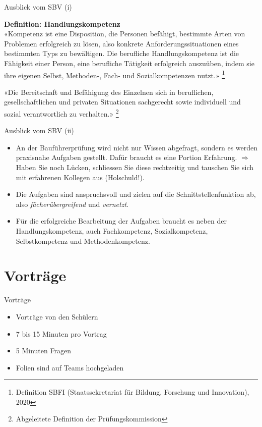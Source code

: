 \begin{frame}{Ausblick vom SBV (i)}

\textbf{Definition: Handlungskompetenz}\\
«Kompetenz ist eine Disposition, die Personen befähigt, bestimmte Arten von Problemen erfolgreich zu lösen, also konkrete Anforderungssituationen eines bestimmten Typs zu bewältigen.
Die berufliche Handlungskompetenz ist die Fähigkeit einer Person, eine berufliche Tätigkeit erfolgreich auszuüben, indem sie ihre eigenen Selbst, Methoden-, Fach- und Sozialkompetenzen nutzt.»
\footnote{Definition SBFI (Staatssekretariat für Bildung, Forschung und Innovation), 2020}
\vspace{1em}

«Die Bereitschaft und Befähigung des Einzelnen sich in beruflichen, gesellschaftlichen und privaten Situationen sachgerecht sowie individuell und sozial verantwortlich zu verhalten.»
\footnote{Abgeleitete Definition der Prüfungskommission}

\end{frame}

\begin{frame}{Ausblick vom SBV (ii)}
\begin{itemize}
    \item[\textbullet] An der Bauführerprüfung wird nicht nur Wissen abgefragt, sondern es werden praxisnahe Aufgaben gestellt. Dafür braucht es eine Portion Erfahrung. $\Rightarrow$ Haben Sie noch Lücken, schliessen Sie diese rechtzeitig und tauschen Sie sich mit erfahrenen Kollegen aus (Holschuld!).
    \item[\textbullet] Die Aufgaben sind anspruchsvoll und zielen auf die Schnittstellenfunktion ab, also \emph{fächerübergreifend} und \emph{vernetzt}.
    \item[\textbullet] Für die erfolgreiche Bearbeitung der Aufgaben braucht es neben der Handlungskompetenz, auch Fachkompetenz, Sozialkompetenz, Selbstkompetenz und Methodenkompetenz.
\end{itemize}
\end{frame}




\section{Vorträge}
\BlueSectionSlide

\begin{frame}{Vorträge}
    \begin{itemize}
        \item[\textbullet] Vorträge von den Schülern
        \item[\textbullet] 7 bis 15 Minuten pro Vortrag
        \item[\textbullet] 5 Minuten Fragen
        \item[\textbullet] Folien sind auf Teams hochgeladen
    \end{itemize}
\end{frame}

